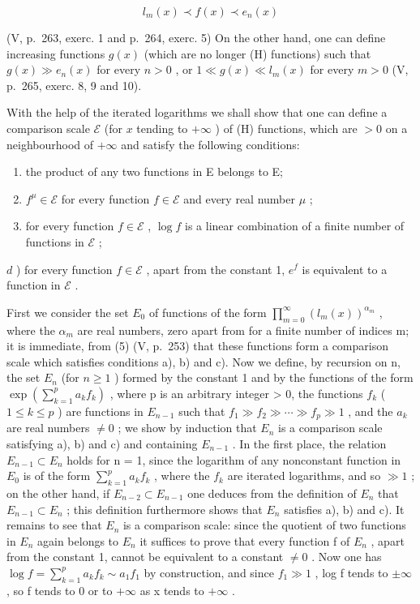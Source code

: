\[
l _ {m} (x) \prec f (x) \prec e _ {n} (x)
\]

(V, p.~263, exerc. 1 and p.~264, exerc. 5) On the other hand, one can define increasing functions \(g(x)\) (which are no longer (H) functions) such that \(g(x) \gg e_n(x)\) for every \(n > 0\) , or \(1 \ll g(x) \ll l_m(x)\) for every \(m > 0\) (V, p.~265, exerc. 8, 9 and 10).

With the help of the iterated logarithms we shall show that one can define a comparison scale \(\mathcal{E}\) (for \(x\) tending to \(+\infty\) ) of (H) functions, which are \(>0\) on a neighbourhood of \(+\infty\) and satisfy the following conditions:

\begin{enumerate}
\def\labelenumi{\alph{enumi})}
\item
  the product of any two functions in E belongs to E;
\item
  \(f^{\mu} \in \mathcal{E}\) for every function \(f \in \mathcal{E}\) and every real number \(\mu\) ;
\item
  for every function \(f \in \mathcal{E}\) , \(\log f\) is a linear combination of a finite number of functions in \(\mathcal{E}\) ;
\end{enumerate}

\(d\) ) for every function \(f \in \mathcal{E}\) , apart from the constant 1, \(e^f\) is equivalent to a function in \(\mathcal{E}\) .

First we consider the set \(E_{0}\) of functions of the form \(\prod_{m=0}^{\infty}\left(l_{m}(x)\right)^{\alpha_{m}}\) , where the \(\alpha_{m}\) are real numbers, zero apart from for a finite number of indices m; it is immediate, from (5) (V, p.~253) that these functions form a comparison scale which satisfies conditions a), b) and c). Now we define, by recursion on n, the set \(E_{n}\) (for \(n \geqslant 1\) ) formed by the constant 1 and by the functions of the form \(\exp\left(\sum_{k=1}^{p}a_{k}f_{k}\right)\) , where p is an arbitrary integer \textgreater{} 0, the functions \(f_{k}\) ( \(1 \leqslant k \leqslant p\) ) are functions in \(E_{n-1}\) such that \(f_{1} \gg f_{2} \gg \cdots \gg f_{p} \gg 1\) , and the \(a_{k}\) are real numbers \(\neq 0\) ; we show by induction that \(E_{n}\) is a comparison scale satisfying a), b) and c) and containing \(E_{n-1}\) . In the first place, the relation \(E_{n-1} \subset E_{n}\) holds for n = 1, since the logarithm of any nonconstant function in \(E_{0}\) is of the form \(\sum_{k=1}^{p}a_{k}f_{k}\) , where the \(f_{k}\) are iterated logarithms, and so \(\gg 1\) ; on the other hand, if \(E_{n-2} \subset E_{n-1}\) one deduces from the definition of \(E_{n}\) that \(E_{n-1} \subset E_{n}\) ; this definition furthermore shows that \(E_{n}\) satisfies a), b) and c). It remains to see that \(E_{n}\) is a comparison scale: since the quotient of two functions in \(E_{n}\) again belongs to \(E_{n}\) it suffices to prove that every function f of \(E_{n}\) , apart from the constant 1, cannot be equivalent to a constant \(\neq 0\) . Now one has \(\log f = \sum_{k=1}^{p}a_{k}f_{k} \sim a_{1}f_{1}\) by construction, and since \(f_{1} \gg 1\) , log f tends to \(\pm\infty\) , so f tends to 0 or to \(+\infty\) as x tends to \(+\infty\) .

